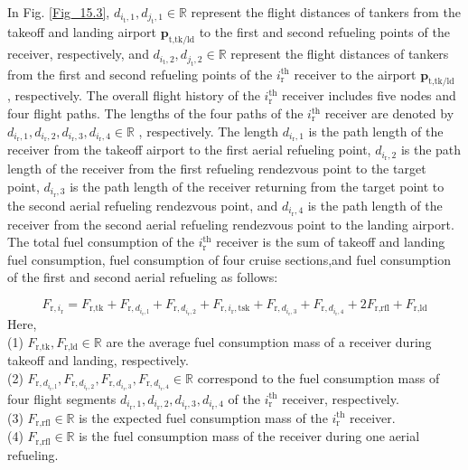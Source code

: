 In Fig. \ref{Fig_15.3}, $d_{i_{\text{t}},1},d_{j_{\text{t}},1}\in\mathbb{R}$  represent the flight distances of tankers from the takeoff and landing airport $\mathbf{p}_{\text{t},\text{tk/ld}}$  to the first and second refueling points of the   receiver, respectively, and $d_{i_{\text{t}},2},d_{j_{\text{t}},2}\in\mathbb{R}$   represent the flight distances of tankers from the first and second refueling points of the $i_{\text{r}}^{\text{th}}$ receiver to the airport  $\mathbf{p}_{\text{t},\text{tk/ld}}$ , respectively. The overall flight history of the $i_{\text{r}}^{\text{th}}$   receiver includes five nodes and four flight paths. The lengths of the four paths of the $i_{\text{r}}^{\text{th}}$   receiver are denoted by $d_{i_{\text{r}},1},d_{i_{\text{r}},2},d_{i_{\text{r}},3},d_{i_{\text{r}},4}\in\mathbb{R}$  , respectively. The length $d_{i_{\text{r}},1}$  is the path length of the receiver from the takeoff airport to the first aerial refueling point, $d_{i_{\text{r}},2}$  is the path length of the receiver from the first refueling rendezvous point to the target point,  $d_{i_{\text{r}},3}$ is the path length of the receiver returning from the target point to the second aerial refueling rendezvous point, and $d_{i_{\text{r}},4}$  is the path length of the receiver from the second aerial refueling rendezvous point to the landing airport.
The total fuel consumption of the  $i_{\text{r}}^{\text{th}}$ receiver is the sum of takeoff and landing fuel consumption, fuel consumption of four cruise sections,and fuel consumption of the first and second aerial refueling as follows: 

\begin{equation}
F_{\text{r},i_{\text{r}}}=F_{\text{r},\text{t}\text{k}}+F_{\text{r},d_{i_{\text{r}},\text{l}}}+F_{\text{r},d_{i_{\text{r}},\text{2}}}+F_{\text{r},i_{\text{r}},\text{t}\text{s}\text{k}}+F_{\text{r},d_{i_{\text{r}},\text{3}}}+F_{\text{r},d_{i_{\text{r}},\text{4}}}+2F_{\text{r},\text{r}\text{f}\text{l}}+F_{\text{r},\text{l}\text{d}}
\label{eq:15.12}
\end{equation}	 
Here,\\
(1) $F_{\text{r},\text{t}\text{k}},F_{\text{r},\text{l}\text{d}}\in\mathbb{R}$	are the average fuel consumption mass of a receiver during takeoff and landing, respectively.\\
(2) $F_{\text{r},d_{i_{\text{r}},\text{l}}},F_{\text{r},d_{i_{\text{r}},\text{2}}},F_{\text{r},d_{i_{\text{r}},\text{3}}},F_{\text{r},d_{i_{\text{r}},\text{4}}}\in\mathbb{R}$	  correspond to the fuel consumption mass of four flight segments   $d_{i_{\text{r}},1},d_{i_{\text{r}},2},d_{i_{\text{r}},3},d_{i_{\text{r}},4}$   of the $i_{\text{r}}^{\text{th}}$  receiver, respectively.\\
(3) $F_{\text{r},\text{r}\text{f}\text{l}}\in\mathbb{R}$	  is the expected fuel consumption mass of the $i_{\text{r}}^{\text{th}}$  receiver.\\
(4) $F_{\text{r},\text{r}\text{f}\text{l}}\in\mathbb{R}$	 is the fuel consumption mass of the receiver during one aerial refueling.

